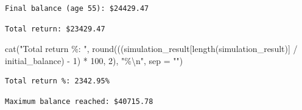 \documentclass[
  letterpaper,
  DIV=11,
  numbers=noendperiod]{scrartcl}
\newenvironment{Shaded}{\begin{snugshade}}{\end{snugshade}}
\newcommand{\AttributeTok}[1]{\textcolor[rgb]{0.40,0.45,0.13}{#1}}
\newcommand{\DecValTok}[1]{\textcolor[rgb]{0.68,0.00,0.00}{#1}}
\newcommand{\FunctionTok}[1]{\textcolor[rgb]{0.28,0.35,0.67}{#1}}
\newcommand{\NormalTok}[1]{\textcolor[rgb]{0.00,0.23,0.31}{#1}}
\newcommand{\SpecialCharTok}[1]{\textcolor[rgb]{0.37,0.37,0.37}{#1}}
\newcommand{\StringTok}[1]{\textcolor[rgb]{0.13,0.47,0.30}{#1}}
\begin{document}
\begin{verbatim}
Final balance (age 55): $24429.47
\end{verbatim}

\begin{Shaded}
\end{Shaded}

\begin{verbatim}
Total return: $23429.47
\end{verbatim}

\begin{Shaded}
\begin{Highlighting}[]
\FunctionTok{cat}\NormalTok{(}\StringTok{"Total return \%: "}\NormalTok{, }\FunctionTok{round}\NormalTok{(((simulation\_result[}\FunctionTok{length}\NormalTok{(simulation\_result)] }\SpecialCharTok{/}\NormalTok{ initial\_balance) }\SpecialCharTok{{-}} \DecValTok{1}\NormalTok{) }\SpecialCharTok{*} \DecValTok{100}\NormalTok{, }\DecValTok{2}\NormalTok{), }\StringTok{"\%}\SpecialCharTok{\textbackslash{}n}\StringTok{"}\NormalTok{, }\AttributeTok{sep =} \StringTok{""}\NormalTok{)}
\end{Highlighting}
\end{Shaded}

\begin{verbatim}
Total return %: 2342.95%
\end{verbatim}

\begin{Shaded}
\end{Shaded}

\begin{verbatim}
Maximum balance reached: $40715.78
\end{verbatim}
\end{document}
